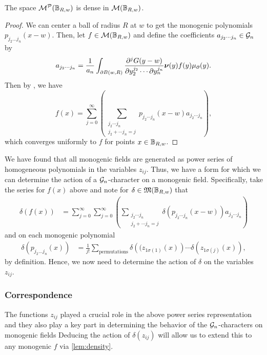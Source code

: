 \begin{lemma}
\label{lem:density}
The space $\mathcal{M}^\mathcal{P}(\mathbb{B}_{R,w})$ is dense in $\mathcal{M}(\mathbb{B}_{R,w})$.
\end{lemma}
\begin{proof}
We can center a ball of radius $R$ at $w$ to get the monogenic polynomials $p_{j_2 \dots j_n}(x-w)$. Then, let $f\in \mathcal{M}(\mathbb{B}_{R,w})$ and define the coefficients $a_{j_2 \cdots j_n}\in \mathcal{G}_n$ by
\begin{equation}
a_{j_2 \cdots j_n} = \frac{1}{a_n} \int_{\partial B(w,R)} \frac{\partial^j G(y-w)}{\partial y_2^{j_2} \cdots \partial y_n^{j_n}} \boldsymbol{\nu}(y) f(y) \mu_\partial(y).
\end{equation}
Then by \cite[Theorem 4]{ryan_clifford_2004}, we have
\begin{equation}
        f(x) = \sum_{j=0}^\infty \left(\sum_{\substack{{j_2 \cdots j_n} \\ {j_2 + \cdots j_n = j}}} p_{j_2 \cdots j_n} (x-w) a_{j_2 \cdots j_n} \right),
\end{equation}
which converges uniformly to $f$ for points $x\in \mathbb{B}_{R,w}$.
\end{proof}

We have found that all monogenic fields are generated as power series of homogeneous polynomials in the variables $z_{ij}$. Thus, we have a form for which we can determine the action of a $\mathcal{G}_n$-character on a monogenic field. Specifically, take the series for $f(x)$ above and note for $\delta \in \mathfrak{M}(\mathbb{B}_{R,w})$ that
\begin{align}
\delta(f(x)) &= \sum_{j=0}^\infty \sum_{j=0}^\infty \left(\sum_{\substack{{j_2 \cdots j_n} \\ {j_2 + \cdots j_n = j}}} \delta(p_{j_2 \cdots j_n} (x-w)) a_{j_2 \cdots j_n} \right)
\end{align}
and on each monogenic polynomial
\begin{align}
\delta(p_{j_2 \dots j_n}(x)) &= \frac{1}{j!} \sum_{\textrm{permutations}}\delta\left((z_{1\sigma(1)}(x)\right) \cdots \delta\left(z_{1\sigma(j)}(x)\right),
\end{align}
by definition. Hence, we now need to determine the action of $\delta$ on the variables $z_{ij}$.

\subsubsection{Correspondence}

The functions $z_{ij}$ played a crucial role in the above power series representation and they also play a key part in determining the behavior of the $\mathcal{G}_n$-characters on monogenic fields  Deducing the action of $\delta(z_{ij})$ will allow us to extend this to any monogenic $f$ via \cref{lem:density}. 

